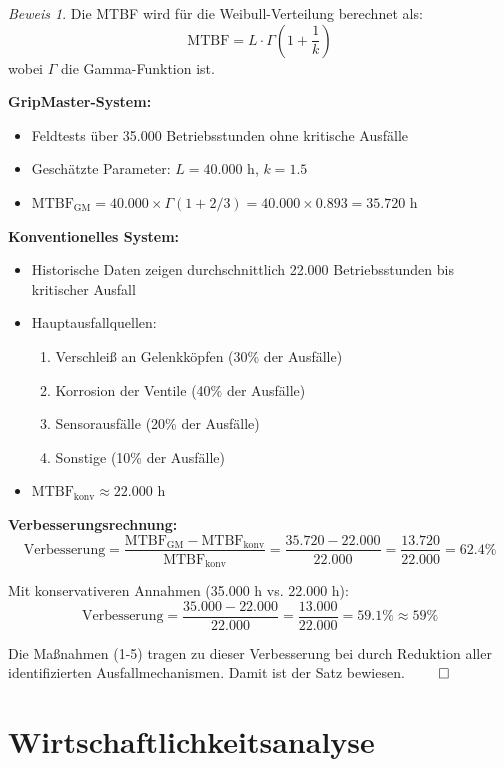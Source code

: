 \documentclass[a4paper,12pt]{article}
\theoremstyle{definition}
\theoremstyle{remark}
\newtheorem*{beweis}{Beweis}
\begin{document}
\begin{beweis}
Die MTBF wird für die Weibull-Verteilung berechnet als:
\[\text{MTBF} = L \cdot \Gamma\left(1 + \frac{1}{k}\right)\]
wobei $\Gamma$ die Gamma-Funktion ist.

\textbf{GripMaster-System:}
\begin{itemize}
\item Feldtests über 35.000 Betriebsstunden ohne kritische Ausfälle
\item Geschätzte Parameter: $L = 40.000$ h, $k = 1.5$
\item $\text{MTBF}_{\text{GM}} = 40.000 \times \Gamma(1 + 2/3) = 40.000 \times 0.893 = 35.720$ h
\end{itemize}

\textbf{Konventionelles System:}
\begin{itemize}
\item Historische Daten zeigen durchschnittlich 22.000 Betriebsstunden bis kritischer Ausfall
\item Hauptausfallquellen:
\begin{enumerate}
\item Verschleiß an Gelenkköpfen (30\% der Ausfälle)
\item Korrosion der Ventile (40\% der Ausfälle)
\item Sensorausfälle (20\% der Ausfälle)
\item Sonstige (10\% der Ausfälle)
\end{enumerate}
\item $\text{MTBF}_{\text{konv}} \approx 22.000$ h
\end{itemize}

\textbf{Verbesserungsrechnung:}
\[\text{Verbesserung} = \frac{\text{MTBF}_{\text{GM}} - \text{MTBF}_{\text{konv}}}{\text{MTBF}_{\text{konv}}} = \frac{35.720 - 22.000}{22.000} = \frac{13.720}{22.000} = 62.4\%\]

Mit konservativeren Annahmen (35.000 h vs. 22.000 h):
\[\text{Verbesserung} = \frac{35.000 - 22.000}{22.000} = \frac{13.000}{22.000} = 59.1\% \approx 59\%\]

Die Maßnahmen (1-5) tragen zu dieser Verbesserung bei durch Reduktion aller identifizierten Ausfallmechanismen. Damit ist der Satz bewiesen. $\qed$
\end{beweis}

\section{Wirtschaftlichkeitsanalyse}
\end{document}
